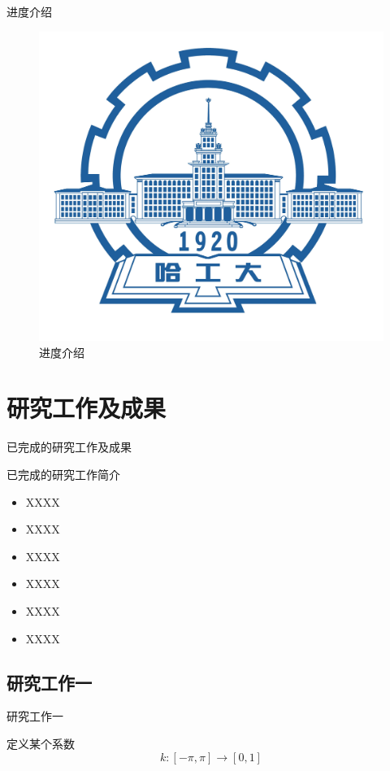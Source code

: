 \documentclass[compress]{beamer}
\begin{document}
\begin{frame}{进度介绍}
  \begin{figure}
    \includegraphics[width=0.6\linewidth]{hitlogo}
    \caption{进度介绍}
  \end{figure}
\end{frame}

\section{研究工作及成果}

\begin{frame}{已完成的研究工作及成果}
  \begin{block}{已完成的研究工作简介}
    \begin{itemize}
      \setlength{\itemsep}{6pt}
      \item XXXX
      \item XXXX
      \item XXXX
      \item XXXX
      \item XXXX
      \item XXXX
    \end{itemize}
  \end{block}
\end{frame}

\subsection{研究工作一}

\begin{frame}{研究工作一}
  \begin{block}{定义某个系数}
    $$
    k: \left[ -\pi , \pi \right] \rightarrow \left[ 0, 1 \right]
    $$
  \end{block}
\end{frame}
\end{document}
